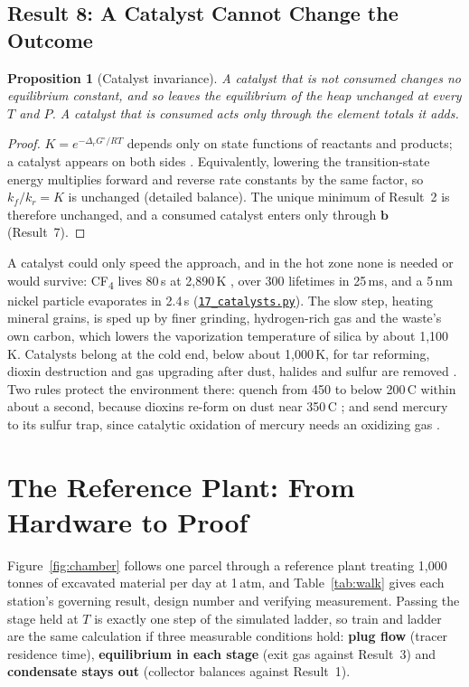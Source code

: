 \documentclass[11pt,a4paper]{article}
\newcommand{\gh}[2]{\href{https://github.com/syncaissa/paramanu-reclaimer/blob/main/#1}{\texttt{#2}}}
\theoremstyle{definition}
\theoremstyle{plain}
\newtheorem{proposition}{Proposition}[section]
\theoremstyle{remark}
\begin{document}
\subsection{Result 8: A Catalyst Cannot Change the Outcome}
\begin{proposition}[Catalyst invariance]\label{prop:catalyst}
A catalyst that is not consumed changes no equilibrium constant, and so leaves the equilibrium of the heap unchanged at every $T$ and $P$. A catalyst that is consumed acts only through the element totals it adds.
\end{proposition}
\begin{proof}
$K = e^{-\Delta_r G^\circ/RT}$ depends only on state functions of reactants and products; a catalyst appears on both sides \citep{laidler1996}. Equivalently, lowering the transition-state energy multiplies forward and reverse rate constants by the same factor, so $k_f/k_r = K$ is unchanged (detailed balance). The unique minimum of Result~2 is therefore unchanged, and a consumed catalyst enters only through $\mathbf{b}$ (Result~7).
\end{proof}
A catalyst could only speed the approach, and in the hot zone none is needed or would survive: CF\textsubscript{4} lives 80\,\textmu s at 2,890\,K \citep{modica1968,cobos2023}, over 300 lifetimes in 25\,ms, and a 5\,nm nickel particle evaporates in 2.4\,\textmu s (\gh{simulation/scripts/17_catalysts.py}{17\_catalysts.py}). The slow step, heating mineral grains, is sped up by finer grinding, hydrogen-rich gas and the waste's own carbon, which lowers the vaporization temperature of silica by about 1,100\,K. Catalysts belong at the cold end, below about 1,000\,K, for tar reforming, dioxin destruction and gas upgrading after dust, halides and sulfur are removed \citep{argyle2015,neuwahl2019}. Two rules protect the environment there: quench from 450 to below 200\,\textdegree C within about a second, because dioxins re-form on dust near 350\,\textdegree C \citep{epa2006dioxin}; and send mercury to its sulfur trap, since catalytic oxidation of mercury needs an oxidizing gas \citep{ji2022}.

\section{The Reference Plant: From Hardware to Proof}\label{sec:walk}

Figure~\ref{fig:chamber} follows one parcel through a reference plant treating 1,000 tonnes of excavated material per day at 1\,atm, and Table~\ref{tab:walk} gives each station's governing result, design number and verifying measurement. Passing the stage held at $T$ is exactly one step of the simulated ladder, so train and ladder are the same calculation if three measurable conditions hold: \textbf{plug flow} (tracer residence time), \textbf{equilibrium in each stage} (exit gas against Result~3) and \textbf{condensate stays out} (collector balances against Result~1).
\end{document}
